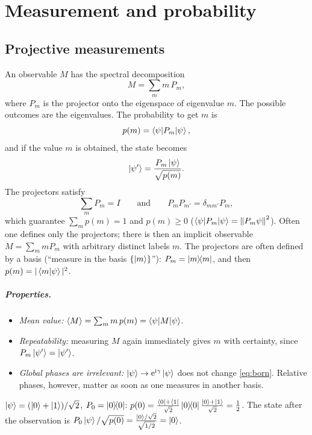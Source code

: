 \chapter{Measurement and probability}\label{ch:measurement}

\section{Projective measurements}
An observable $M$ has the spectral decomposition
\begin{equation}
  M=\sum_m m\,P_m,
\end{equation}
where $P_m$ is the projector onto the eigenspace of eigenvalue $m$. The possible outcomes are the eigenvalues. The probability to get $m$ is
\begin{equation}\label{eq:born}
  p(m)=\left\langle\psi\middle|P_m\middle|\psi\right\rangle,
\end{equation}
and if the value $m$ is obtained, the state becomes
\begin{equation}\label{eq:collapse}
  \left|\psi'\right\rangle=\frac{P_m\left|\psi\right\rangle}{\sqrt{p(m)}}.
\end{equation}
The projectors satisfy
\begin{equation}
  \sum_mP_m=I\qquad\text{and}\qquad P_mP_{m'}=\delta_{mm'}P_m,
\end{equation}
which guarantee $\sum_mp(m)=1$ and $p(m)\ge0$ ($\left\langle\psi\middle|P_m\middle|\psi\right\rangle=\left\|P_m\psi\right\|^2$). Often one defines only the projectors; there is then an implicit
observable $M=\sum_m m P_m$ with arbitrary distinct labels $m$. The projectors are often defined by a basis (``measure in the basis $\{\left|m\right\rangle\}$''):
$P_m=\left|m\middle\rangle\!\middle\langle m\right|$, and then $p(m)=|\left\langle m\middle|\psi\right\rangle|^2$.

\paragraph{Properties.}
\begin{itemize}
  \item \emph{Mean value:} $\left\langle M\right\rangle=\sum_m m\,p(m)=\left\langle\psi\middle|M\middle|\psi\right\rangle$.
  \item \emph{Repeatability:} measuring $M$ again immediately gives $m$ with certainty, since $P_m\left|\psi'\right\rangle=\left|\psi'\right\rangle$.
  \item \emph{Global phases are irrelevant:} $\left|\psi\right\rangle\to\mathrm e^{\mathrm i\gamma}\left|\psi\right\rangle$ does not change \cref{eq:born}. Relative phases, however, matter as soon
  as one measures in another basis.
\end{itemize}

\begin{example}
$\left|\psi\right\rangle=(\left|0\right\rangle+\left|1\right\rangle)/\sqrt2$, $P_0=\left|0\middle\rangle\!\middle\langle0\right|$:
$p(0)=\frac{\left\langle0\right|+\left\langle1\right|}{\sqrt2}\left|0\middle\rangle\!\middle\langle0\right|\frac{\left|0\right\rangle+\left|1\right\rangle}{\sqrt2}=\frac12$. The state after the observation is
$P_0\left|\psi\right\rangle/\sqrt{p(0)}=\frac{\left|0\right\rangle/\sqrt2}{\sqrt{1/2}}=\left|0\right\rangle$.
\end{example}


